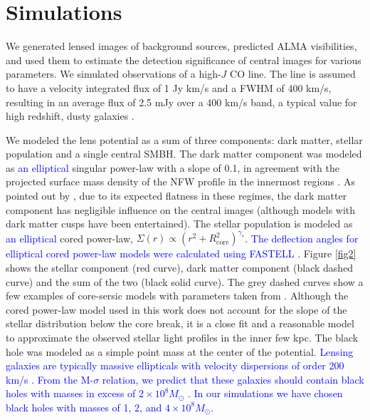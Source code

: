 \documentclass[chicago]{emulateapj}
\newcommand{\blue}{\textcolor{blue}}
\begin{document}
\section{Simulations}
We generated lensed images of background sources, predicted ALMA visibilities, and used them to estimate the detection significance of central images for various parameters. We simulated observations of a high-$J$ CO line. The line is assumed to have a velocity integrated flux of 1 Jy km/s and a FWHM of 400 km/s, resulting in an average flux of 2.5 mJy over a 400 km/s band, a typical value for high redshift, dusty galaxies \citep{Bothwell:12}. 

We modeled the lens potential as a sum of three components: dark matter, stellar population and a single central SMBH. The dark matter component was modeled as \blue{an elliptical} singular power-law with a slope of 0.1, in agreement with the projected surface mass density of the NFW profile in the innermost regions \citep{Golse:02}. As  pointed out by \citet{Keeton:03}, due to its expected flatness in these regimes, the dark matter component has negligible influence on the central images (although models with dark matter cusps have been entertained). 
The stellar population is modeled as \blue{an elliptical} cored power-law, $\Sigma(r)\propto (r^2+R_{\mathrm{core}}^2)^{\gamma_s}$. \blue{The deflection angles for elliptical cored power-law models were calculated using FASTELL \citep{Barkana:98}.}  Figure \ref{fig2} shows the stellar component (red curve), dark matter component (black dashed curve) and the sum of the two (black solid curve). The grey dashed curves show a few examples of core-sersic models with parameters taken from \citet{Ferrarese:06}. Although the cored power-law model used in this work does not account for the slope of the stellar distribution below the core break, it is a close fit and a reasonable model to approximate the observed stellar light profiles in the inner few kpc. 
The black hole was modeled as a simple point mass at the center of the potential. 
\blue{Lensing galaxies are typically massive ellipticals with velocity dispersions of order 200 km/s \citep[e.g.,][]{Sonnenfeld:13}. From the M-$\sigma$ relation, we predict that these galaxies should contain black holes with masses in excess of $2\times10^8 M_{\odot}$ \citep[e.g.,][]{Kormendy:13}. In our simulations we have chosen black holes with masses of 1, 2, and $4 \times 10^8 M_{\odot}$.}
\end{document}
